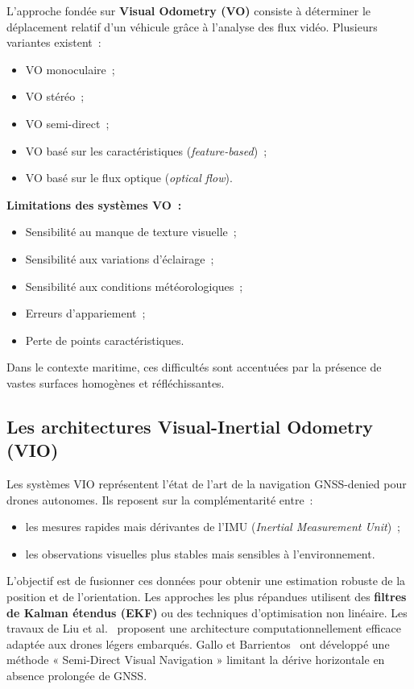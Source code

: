 \documentclass[12pt, a4paper, twoside, openright]{report}
\begin{document}
L'approche fondée sur \textbf{Visual Odometry (VO)} consiste à déterminer le déplacement relatif d'un véhicule grâce à l'analyse des flux vidéo. Plusieurs variantes existent~:

\begin{itemize}
    \item VO monoculaire~;
    \item VO stéréo~;
    \item VO semi-direct~;
    \item VO basé sur les caractéristiques (\textit{feature-based})~;
    \item VO basé sur le flux optique (\textit{optical flow}).
\end{itemize}

\textbf{Limitations des systèmes VO~:}
\begin{itemize}
    \item Sensibilité au manque de texture visuelle~;
    \item Sensibilité aux variations d'éclairage~;
    \item Sensibilité aux conditions météorologiques~;
    \item Erreurs d'appariement~;
    \item Perte de points caractéristiques.
\end{itemize}

Dans le contexte maritime, ces difficultés sont accentuées par la présence de vastes surfaces homogènes et réfléchissantes.

\subsection{Les architectures Visual-Inertial Odometry (VIO)}

Les systèmes VIO représentent l'état de l'art de la navigation GNSS-denied pour drones autonomes. Ils reposent sur la complémentarité entre~:

\begin{itemize}
    \item les mesures rapides mais dérivantes de l'IMU (\textit{Inertial Measurement Unit})~;
    \item les observations visuelles plus stables mais sensibles à l'environnement.
\end{itemize}

L'objectif est de fusionner ces données pour obtenir une estimation robuste de la position et de l'orientation. Les approches les plus répandues utilisent des \textbf{filtres de Kalman étendus (EKF)} ou des techniques d'optimisation non linéaire. Les travaux de Liu et al.~\cite{liu2020visual} proposent une architecture computationnellement efficace adaptée aux drones légers embarqués. Gallo et Barrientos~\cite{gallo2023semi} ont développé une méthode « Semi-Direct Visual Navigation » limitant la dérive horizontale en absence prolongée de GNSS.
\end{document}
